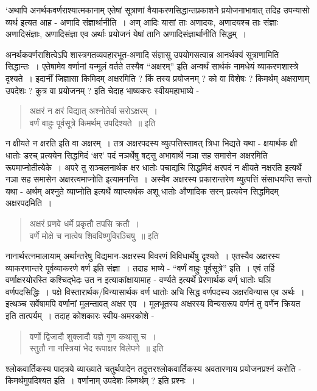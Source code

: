 {‘अथापि अनर्थकवर्णराश्यात्मकानाम् एतेषां सूत्राणां वैयाकरणसिद्धान्तप्रकाशने प्रयोजना\-भावात् तदिह उपन्यासो व्यर्थ इत्यत आह - अणादि संज्ञार्थानीति~। अण् आदिः  यासां ताः अणादयः, अणादयश्च ताः संज्ञाः अणादिसंज्ञाः, अणादिसंज्ञा एव अर्थाः  प्रयोजनं येषां तानि अणादिसंज्ञार्थानीति सिद्धम्~। 

अनर्थकवर्णराशित्वेऽपि शास्त्रगतव्यवहारभूत-अणादि संज्ञासु उपयोगसत्वान्न आनर्थक्यं सूत्राणामिति सिद्धान्तः~। एतेषामेव वर्णानां यन्मूलं वर्तते तस्यैव “अक्षरम्” इति अन्वर्थं सार्थकं नामधेयं व्याकरणशास्त्रे दृश्यते~। इदानीं जिज्ञासा किमिदम् अक्षरमिति ? किं तस्य प्रयोजनम् ? को वा विशेषः ? किमर्थम् अक्षराणाम् उपदेशः ? कुत्र वा प्रयोजनम् ? इति चेदाह भाष्यकरः स्वीयमहाभाष्ये - 		
\begin{verse}
अक्षरं न क्षरं विद्यात्  अश्नोतेर्वा सरोऽक्षरम्~। \\
वर्णं वाहुः पूर्वसूत्रे किमर्थम् उपदिश्यते~॥ इति
\end{verse}
न क्षीयते न क्षरति इति वा अक्षरम्~। तत्र अक्षरपदस्य व्युत्पत्तिस्तावत् त्रिधा भिद्यते यथा - क्षयार्थक क्षी धातोः डरच् प्रत्ययेन सिद्धमिदं ‘क्षर’ पदं नञर्थेषु षट्सु अभावार्थे नञा सह समासेन अक्षरमिति रूपमाप्नोतीत्येके~। अपरे तु सञ्चलनार्थक क्षर धातोः पचाद्यचि सिद्धमिदं क्षरपदं न क्षीयते नक्षरति इत्यर्थे नञा सह समासेन अक्षरत्वमाप्नोति इत्यामनन्ति~। अस्यैव अक्षरस्य  प्रकारान्तरेण व्युत्पत्तिं संसाधयन्ति सन्तो यथा - अर्थम् अश्नुते व्याप्नोति इत्यर्थे व्याप्त्यर्थक अशू धातोः औणादिक सरन् प्रत्ययेन सिद्धमिदम् अक्षरपदमिति~। 
\begin{verse}
अक्षरं प्रणवे धर्मे प्रकृतौ तपसि क्रतौ~। \\
वर्णे मोक्षे च नात्वेष शिवविष्णुविरञ्चिषु~॥ इति
\end{verse}
नानार्थरत्नमालायाम् अर्थान्तरेषु विद्यमान-अक्षरस्य विवरणं विविधार्थेषु दृश्यते~। एतस्यैव अक्षरस्य व्याकरणान्तरे पूर्वव्याकरणे वर्ण इति संज्ञा~। तदाह भाष्ये - “वर्णं वाहुः पूर्वसूत्रे” इति~। एवं तर्हि वर्णाक्षरयोरस्ति कश्चिद्भेदः उत न इत्याकांक्षायामाह - वर्ण्यते इत्यर्थे प्रेरणार्थक वर्ण् धातोः घञि वर्णपदसिद्धिः~। पक्षे विस्तारार्थक/विन्यासार्थक वर्ण धातोः अचि सिद्ध वर्णपदस्य अक्षरविन्यास एव अर्थः~। इत्थञ्च सर्वेषामपि वर्णानां मूलन्तावत् अक्षर एव~। मूलभूतस्य अक्षरस्य विन्यसरूप वर्णनं तु वर्णेन क्रियत इति तात्पर्यम्~। तदाह कोशकारः स्वीय-अमरकोशे -
\begin{verse}
वर्णो द्विजादौ शुक्लादौ यज्ञे गुण कथासु च~। \\
स्तुतौ ना नस्त्रियां भेद रूपाक्षर विलेपने~॥  इति
\end{verse}
श्लोकवार्तिकस्य पादत्रये व्याख्याते चतुर्थपादेन तदुत्तरश्लोकवार्तिकस्य अवतारणाय प्रयोजनप्रश्नं करोति - किमर्थमुपदिश्यत इति~। वर्णानाम् उपदेशः किमर्थम् ? इति प्रश्नः~। 

}
